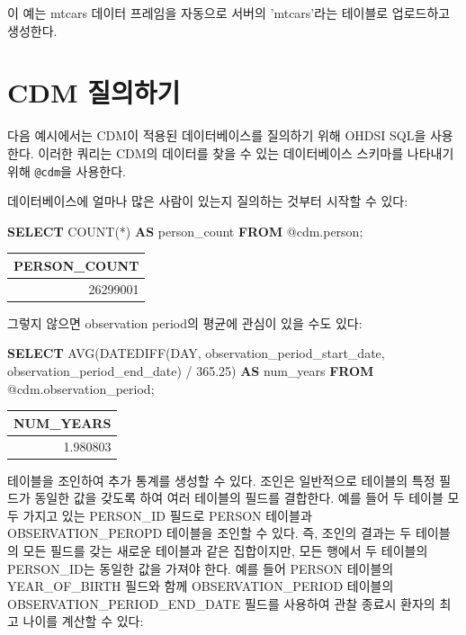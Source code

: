 \documentclass[11pt]{book}
\newenvironment{Shaded}{\begin{snugshade}}{\end{snugshade}}
\newcommand{\KeywordTok}[1]{\textcolor[rgb]{0.13,0.29,0.53}{\textbf{#1}}}
\newcommand{\DataTypeTok}[1]{\textcolor[rgb]{0.13,0.29,0.53}{#1}}
\newcommand{\FloatTok}[1]{\textcolor[rgb]{0.00,0.00,0.81}{#1}}
\newcommand{\FunctionTok}[1]{\textcolor[rgb]{0.00,0.00,0.00}{#1}}
\newcommand{\NormalTok}[1]{#1}
\theoremstyle{definition}
\theoremstyle{definition}
\theoremstyle{definition}
\theoremstyle{remark}
\begin{document}
이 예는 mtcars 데이터 프레임을 자동으로 서버의 'mtcars'라는 테이블로
업로드하고 생성한다.

\section{CDM 질의하기}\label{QueryTheCdm}

다음 예시에서는 CDM이 적용된 데이터베이스를 질의하기 위해 OHDSI SQL을
사용한다. 이러한 쿼리는 CDM의 데이터를 찾을 수 있는 데이터베이스
스키마를 나타내기 위해 \texttt{@cdm}을 사용한다.

데이터베이스에 얼마나 많은 사람이 있는지 질의하는 것부터 시작할 수 있다:

\begin{Shaded}
\begin{Highlighting}[]
\KeywordTok{SELECT} \FunctionTok{COUNT}\NormalTok{(*) }\KeywordTok{AS}\NormalTok{ person_count }\KeywordTok{FROM}\NormalTok{ @cdm.person;}
\end{Highlighting}
\end{Shaded}

\begin{longtable}[]{@{}r@{}}
\toprule
PERSON\_COUNT\tabularnewline
\midrule
\endhead
26299001\tabularnewline
\bottomrule
\end{longtable}

그렇지 않으면 observation period의 평균에 관심이 있을 수도 있다:

\begin{Shaded}
\begin{Highlighting}[]
\KeywordTok{SELECT} \FunctionTok{AVG}\NormalTok{(DATEDIFF(}\DataTypeTok{DAY}\NormalTok{, }
\NormalTok{                    observation_period_start_date, }
\NormalTok{                    observation_period_end_date) / }\FloatTok{365.25}\NormalTok{) }\KeywordTok{AS}\NormalTok{ num_years}
\KeywordTok{FROM}\NormalTok{ @cdm.observation_period;}
\end{Highlighting}
\end{Shaded}

\begin{longtable}[]{@{}r@{}}
\toprule
NUM\_YEARS\tabularnewline
\midrule
\endhead
1.980803\tabularnewline
\bottomrule
\end{longtable}

테이블을 조인하여 추가 통계를 생성할 수 있다. 조인은 일반적으로 테이블의
특정 필드가 동일한 값을 갖도록 하여 여러 테이블의 필드를 결합한다. 예를
들어 두 테이블 모두 가지고 있는 PERSON\_ID 필드로 PERSON 테이블과
OBSERVATION\_PEROPD 테이블을 조인할 수 있다. 즉, 조인의 결과는 두
테이블의 모든 필드를 갖는 새로운 테이블과 같은 집합이지만, 모든 행에서
두 테이블의 PERSON\_ID는 동일한 값을 가져야 한다. 예를 들어 PERSON
테이블의 YEAR\_OF\_BIRTH 필드와 함께 OBSERVATION\_PERIOD 테이블의
OBSERVATION\_PERIOD\_END\_DATE 필드를 사용하여 관찰 종료시 환자의 최고
나이를 계산할 수 있다:
\end{document}
